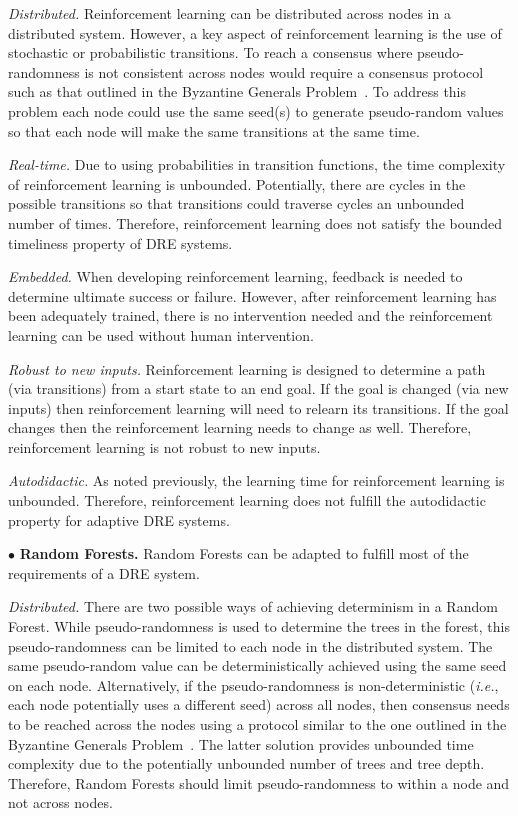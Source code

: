 \documentclass[conference]{IEEEtran}
\begin{document}
\emph{Distributed.} Reinforcement learning can be distributed across nodes in a distributed system. However, a key aspect of reinforcement learning is the use of stochastic or probabilistic transitions. To reach a consensus where pseudo-randomness is not consistent across nodes would require a consensus protocol such as that outlined in the Byzantine Generals Problem~\cite{Lamport:82}. To address this problem each node could use the same seed(s) to generate pseudo-random values so that each node will make the same transitions at the same time.

\emph{Real-time.} Due to using probabilities in transition functions, the time complexity of reinforcement learning is unbounded. Potentially, there are cycles in the possible transitions so that transitions could traverse cycles an unbounded number of times. Therefore, reinforcement learning does not satisfy the bounded timeliness property of DRE systems.

\emph{Embedded.} When developing reinforcement learning, feedback is needed to determine ultimate success or failure. However, after reinforcement learning has been adequately trained, there is no intervention needed and the reinforcement learning can be used without human intervention.

\emph{Robust to new inputs.} Reinforcement learning is designed to determine a path (via transitions) from a start state to an end goal. If the goal is changed (via new inputs) then reinforcement learning will need to relearn its transitions. If the goal changes then the reinforcement learning needs to change as well. Therefore, reinforcement learning is not robust to new inputs.

\emph{Autodidactic.} As noted previously, the learning time for reinforcement learning is unbounded. Therefore, reinforcement learning does not fulfill the autodidactic property for adaptive DRE systems.


$\bullet$ {\bf Random Forests.}
Random Forests can be adapted to fulfill most of the requirements of a DRE system.

\emph{Distributed.} There are two possible ways of achieving determinism in a Random Forest. While pseudo-randomness is used to determine the trees in the forest, this pseudo-randomness can be limited to each node in the distributed system. The same pseudo-random value can be deterministically achieved using the same seed on each node. Alternatively, if the pseudo-randomness is non-deterministic (\emph{i.e.}, each node potentially uses a different seed) across all nodes, then consensus needs to be reached across the nodes using a protocol similar to the one outlined in the Byzantine Generals Problem~\cite{Lamport:82}. The latter solution provides unbounded time complexity due to the potentially unbounded number of trees and tree depth. Therefore, Random Forests should limit pseudo-randomness to within a node and not across nodes.
\end{document}
